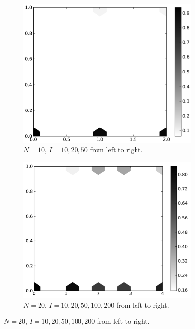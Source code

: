 \documentclass{amsart}
\begin{document}
\begin{figure}[h!tbp]  
  \begin{subfigure}{.3\linewidth}
    \centering
    \includegraphics[width=\linewidth]{pop10iter.png}
    \caption{$N=10$,  $I = 10, 20, 50$ from left to right.}
    \label{fig:pop10iter}
  \end{subfigure}
  \hspace{.01\linewidth}
  \begin{subfigure}{.3\linewidth}  
    \centering
    \includegraphics[width=\linewidth]{pop20iter.png}
    \caption{$N=20$,  $I = 10,20,50,100,200$ from left to right.}

\end{subfigure}
\end{figure}
\end{document}

